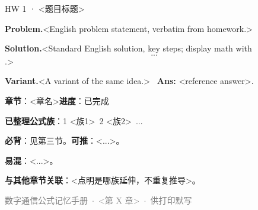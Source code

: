 \documentclass[11pt,a4paper]{ctexart}
\newcommand{\prob}{\par\addvspace{3pt}\noindent\textbf{\textcolor{purple!50!black}{Problem.}}\quad}
\newcommand{\sol}{\par\addvspace{3pt}\noindent\textbf{\textcolor{blue!45!black}{Solution.}}\quad}
\newcommand{\var}{\par\addvspace{3pt}\noindent\textbf{\textcolor{orange!75!black}{Variant.}}\quad}
\begin{document}
\begin{probbox}{HW 1 · <题目标题>}
\prob <English problem statement, verbatim from homework.>
\sol <Standard English solution, key steps; display math with $$...$$.>
\var <A variant of the same idea.> \ \textbf{Ans:} <reference answer>.
\end{probbox}

\begin{tcolorbox}[enhanced, breakable, sharp corners,
  colback=gray!4, colframe=gray!55, boxrule=0.5pt,
  title={\bfseries\sffamily 八、本章公式总账（速记）},
  colbacktitle=gray!35!black, coltitle=white,
  left=10pt, right=10pt, top=4pt, bottom=4pt]
\textbf{章节}：<章名>\hfill\textbf{进度}：已完成

\smallskip
\textbf{已整理公式族}：1 <族1>\ 2 <族2>\ ...

\smallskip
\textbf{必背}：见第三节。\quad \textbf{可推}：<...>。

\smallskip
\textbf{易混}：<...>。

\smallskip
\textbf{与其他章节关联}：<点明是哪族延伸，不重复推导>。
\end{tcolorbox}

\vspace{6pt}
\begin{center}\small\textcolor{gray}{数字通信公式记忆手册 \,$\cdot$\, <第 X 章> \,$\cdot$\, 供打印默写}\end{center}
\end{document}
